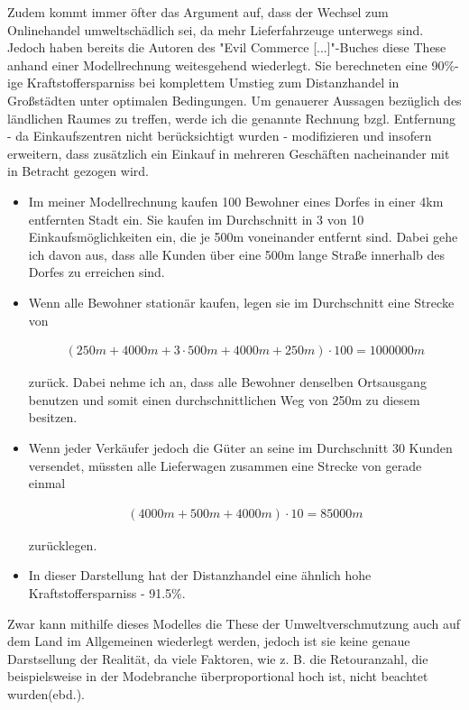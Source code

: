 \begin{folding} %

Zudem kommt immer öfter das Argument auf, dass der Wechsel zum Onlinehandel umweltschädlich sei, da mehr Lieferfahrzeuge unterwegs sind. Jedoch haben bereits die Autoren des "Evil Commerce [...]"-Buches diese These anhand einer Modellrechnung weitesgehend wiederlegt. Sie berechneten eine 90\%-ige Kraftstoffersparniss bei komplettem Umstieg zum Distanzhandel in Großstädten unter optimalen Bedingungen\cite[S. 25f]{evilcom}. Um genauerer Aussagen bezüglich des ländlichen Raumes zu treffen, werde ich die genannte Rechnung bzgl. Entfernung - da Einkaufszentren nicht berücksichtigt wurden - modifizieren und insofern erweitern, dass zusätzlich ein Einkauf in mehreren Geschäften nacheinander mit in Betracht gezogen wird.

\begin{itemize}

\item Im meiner Modellrechnung kaufen 100 Bewohner eines Dorfes in einer 4km entfernten Stadt ein. Sie kaufen im Durchschnitt in 3 von 10 Einkaufsmöglichkeiten ein, die je 500m voneinander entfernt sind. Dabei gehe ich davon aus, dass alle Kunden über eine 500m lange Straße innerhalb des Dorfes zu erreichen sind.

\item Wenn alle Bewohner stationär kaufen, legen sie im Durchschnitt eine Strecke von 

\begin{align}(250m + 4000m + 3 \cdot 500m + 4000m + 250m) \cdot 100 = 1000000m\end{align}

 zurück. Dabei nehme ich an, dass alle Bewohner denselben Ortsausgang benutzen und somit einen durchschnittlichen Weg von 250m zu diesem besitzen.

\item Wenn jeder Verkäufer jedoch die Güter an seine im Durchschnitt 30 Kunden versendet, müssten alle Lieferwagen zusammen eine Strecke von gerade einmal 

\begin{align}(4000m + 500m + 4000m) \cdot 10 = 85000m\end{align}

zurücklegen.
\item In dieser Darstellung hat der Distanzhandel eine ähnlich hohe Kraftstoffersparniss - 91.5\%. 

\end{itemize}
Zwar kann mithilfe dieses Modelles die These der Umweltverschmutzung auch auf dem Land im Allgemeinen wiederlegt werden, jedoch ist sie keine genaue Darstsellung der Realität, da viele Faktoren, wie z. B. die Retouranzahl, die beispielsweise in der Modebranche überproportional hoch ist, nicht beachtet wurden(ebd.).

\end{folding}

